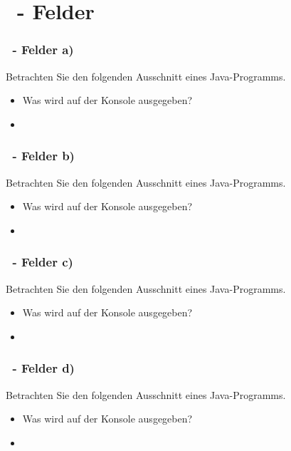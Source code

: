 \def\stitle{\theexercise\ - Felder}
\section{\stitle}

\begin{frame}[t]%
    \frametitle{\stitle \: a)}
  \medskip

  Betrachten Sie den folgenden Ausschnitt eines Java-Programms.
  
  \begin{itemize}
  \item Was wird auf der Konsole ausgegeben?
  \pause
  \item \code{[1, 3, 6, 10, 15]}
  \end{itemize}
\end{frame}


\begin{frame}[t]%
    \frametitle{\stitle \: b)}
  \medskip
  Betrachten Sie den folgenden Ausschnitt eines Java-Programms.
  
  \begin{itemize}
  \item Was wird auf der Konsole ausgegeben?
  \pause
  \item \code{[1, 3, 5, 7, 9]}
  \end{itemize}
\end{frame}

\begin{frame}[t]%
    \frametitle{\stitle \: c)}
  \medskip
  Betrachten Sie den folgenden Ausschnitt eines Java-Programms.
  
  \begin{itemize}
  \item Was wird auf der Konsole ausgegeben?
  \pause
  \item \code{[1, 2, 3, 2, 1]}
  \end{itemize}
\end{frame}


\begin{frame}[t]%
    \frametitle{\stitle \: d)}
  \medskip
  Betrachten Sie den folgenden Ausschnitt eines Java-Programms.
  
  \begin{itemize}
  \item Was wird auf der Konsole ausgegeben?
  \pause
  \item \code{[0, 0, 3, 3, 3]}
  \end{itemize}
\end{frame}

